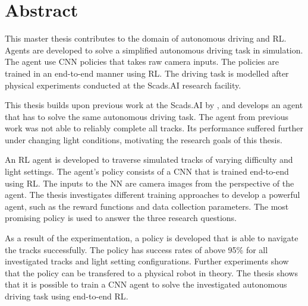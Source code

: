 \section*{Abstract}
\label{sec:Abstract}
\acresetall

This master thesis contributes to the domain of autonomous driving and \ac{RL}. Agents are developed to solve a simplified autonomous driving task in simulation. The agent use \ac{CNN} policies that takes raw camera inputs. The policies are trained in an end-to-end manner using \ac{RL}. The driving task is modelled after physical experiments conducted at the Scads.AI research facility.

This thesis builds upon previous work at the Scads.AI by \autocite{maximilian}, and develops an agent that has to solve the same autonomous driving task. The agent from previous work was not able to reliably complete all tracks. Its performance suffered further under changing light conditions, motivating the research goals of this thesis.

An \ac{RL} agent is developed to traverse simulated tracks of varying difficulty and light settings. The agent's policy consists of a \ac{CNN} that is trained end-to-end using \ac{RL}. The inputs to the \ac{NN} are camera images from the perspective of the agent.
The thesis investigates different training approaches to develop a powerful agent, such as the reward functions and data collection parameters. The most promising policy is used to answer the three research questions.

As a result of the experimentation, a policy is developed that is able to navigate the tracks successfully. The policy has success rates of above 95\% for all investigated tracks and light setting configurations. Further experiments show that the policy can be transfered to a physical robot in theory.
The thesis shows that it is possible to train a \ac{CNN} agent to solve the investigated autonomous driving task using end-to-end \ac{RL}.
